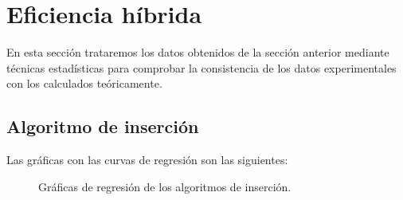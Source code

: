 \documentclass{homework}
\begin{document}
    \section{Eficiencia híbrida}
    
    En esta sección trataremos los datos obtenidos de la sección anterior mediante técnicas estadísticas para
    comprobar la consistencia de los datos experimentales con los calculados teóricamente. 

    \subsection{Algoritmo de inserción}

    Las gráficas con las curvas de regresión son las siguientes:

    \begin{figure}[h]
        \centering


        \caption{Gráficas de regresión de los algoritmos de inserción.}

        \label{hib:insercion}
    \end{figure}
\end{document}
